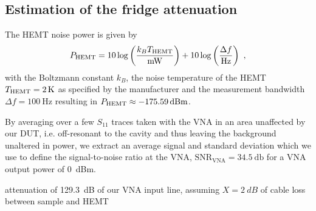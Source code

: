 \subsection{Estimation of the fridge attenuation}\label{sec:attenuation}
The HEMT noise power is given by
%
\begin{align}
P_{\rm HEMT}=10\log\left(\frac{k_B T_{\rm HEMT}}{\si{\milli\watt}}\right) + 10\log\left(\frac{\Delta f}{\si{\hertz}}\right)\ ,
\label{eq:HEMT}
\end{align}
%
with the Boltzmann constant $k_B$, the noise temperature of the HEMT $T_{\rm HEMT}=\SI{2}{\kelvin}$ as specified by the manufacturer and the measurement bandwidth $\Delta f=\SI{100}{\hertz}$ resulting in $P_{\rm HEMT}\approx\SI{-175.59}{dBm}$.

By averaging over a few $S_{11}$ traces taken with the VNA in an area unaffected by our DUT, i.e. off-resonant to the cavity and thus leaving the background unaltered in power, we extract an average signal and standard deviation which we use to define the signal-to-noise ratio at the VNA, $\text{SNR}_\text{VNA}=\SI{34.5}{\decibel}$ for a VNA output power of \SI{0}{dBm}.

attenuation of \SI{129.3}{dB} of our VNA input line, assuming $X=\SI{2}{dB}$ of cable loss between sample and HEMT


